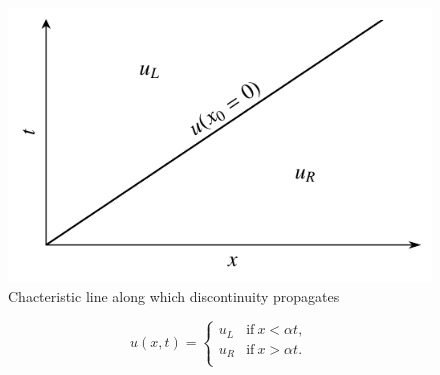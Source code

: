 \begin{figure}[htbp]
	\centering
	\includegraphics[width=0.5\linewidth]{Pictures/ch11_riem_lsc_characteristics}
	\caption{Chacteristic line along which discontinuity propagates}
	\label{fig:riem_charact_scalar}
\end{figure}
\begin{eqBox}
\begin{equation}
	u(x,t) = 
	\begin{cases}
		u_L & \text{if}~x<\alpha t,\\
		u_R & \text{if}~x>\alpha t.\\
	\end{cases}
\end{equation}
\end{eqBox}
